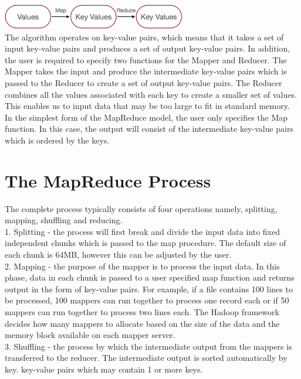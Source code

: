 \documentclass[11pt]{book}
\begin{document}
\includegraphics[width=8cm]{keyvalue} \\

The algorithm operates on key-value pairs, which means that it takes a set of input key-value pairs and produces a set of output key-value pairs. In addition, the user is required to specify two functions for the Mapper and Reducer. The Mapper takes the input and produce the intermediate key-value pairs which is passed to the Reducer to create a set of output key-value pairs. The Reducer combines all the values associated with each key to create a smaller set of values. This enables us to input data that may be too large to fit in standard memory.\\

In the simplest form of the MapReduce model, the user only specifies the Map function. In this case, the output will consist of the intermediate key-value pairs which is ordered by the keys. 

\section{The MapReduce Process}

The complete process typically consists of four operations namely, splitting, mapping, shuffling and reducing.\\

1. Splitting - the process will first break and divide the input data into fixed independent chunks which is passed to the map procedure. The default size of each chunk is 64MB, however this can be adjusted by the user. \\

2. Mapping - the purpose of the mapper is to process the input data. In this phase, data in each chunk is passed to a user specified map function and returns output in the form of key-value pairs. For example, if a file contains 100 lines to be processed, 100 mappers can run together to process one record each or if 50 mappers can run together to process two lines each. The Hadoop framework decides how many mappers to allocate based on the size of the data and the memory block available on each mapper server.\\

3. Shuffling - the process by which the intermediate output from the mappers is transferred to the reducer. The intermediate output is sorted automatically by key. key-value pairs which may contain 1 or more keys.
\end{document}
